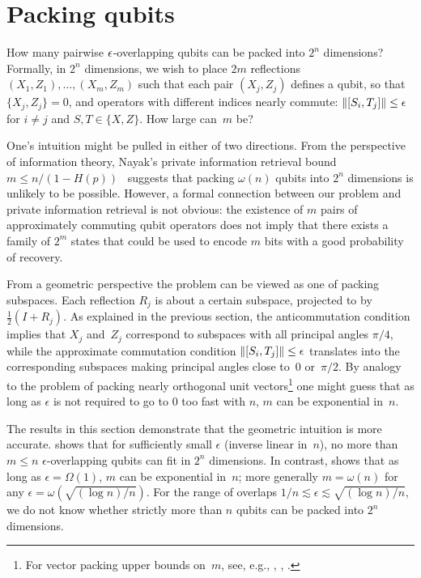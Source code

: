 \documentclass[preprintnumbers,11pt,onecolumn]{article}
\begin{document}
\section{Packing qubits} \label{s:packing}

How many pairwise ${\epsilon}$-overlapping qubits can be packed into $2^n$ dimensions?  Formally, in $2^n$ dimensions, we wish to place $2 m$ reflections $(X_1, Z_1), \ldots, (X_m, Z_m)$ such that each pair $(X_j,Z_j)$ defines a qubit, so that $\{ X_j, Z_j \} = 0$, and operators with different indices nearly commute: ${\| [S_i, T_j] \|} \leq \epsilon$ for $i \neq j$ and $S, T\in \{X,Z\}$. How large can~$m$ be?  

One's intuition might be pulled in either of two directions.  From the perspective of information theory, Nayak's private information retrieval bound $m \leq n / (1 - H(p))$~\cite{Nayak99privateinformationretrieval} suggests that packing $\omega(n)$ qubits into $2^n$ dimensions is unlikely to be possible.  However, a formal connection between our problem and private information retrieval is not obvious: the existence of $m$ pairs of approximately commuting qubit operators does not imply that there exists a family of $2^m$ states that could be used to encode $m$ bits with a good probability of recovery. 

From a geometric perspective the problem can be viewed as one of packing subspaces.  Each reflection $R_j$ is about a certain subspace, projected to by $\tfrac12(I + R_j)$. As explained in the previous section, the anticommutation condition implies that $X_j$ and~$Z_j$ correspond to subspaces with all principal angles $\pi/4$, while the approximate commutation condition ${\| [S_i, T_j] \|} \leq \epsilon$ translates into the corresponding subspaces making principal angles close to~$0$ or~$\pi/2$. By analogy to the problem of packing nearly orthogonal unit vectors\footnote{For vector packing upper bounds on~$m$, see, e.g., \cite{KabatjanskiiLevenstein78vectorpacking}, \cite[Lemma~9.1]{Alon03extremal1}, \cite{Tao13vectorpacking}.} one might guess that as long as $\epsilon$ is not required to go to $0$ too fast with $n$, $m$ can be exponential in~$n$.  

The results in this section demonstrate that the geometric intuition is more accurate.   shows that for sufficiently small $\epsilon$ (inverse linear in~$n$), no more than $m \leq n$ $\epsilon$-overlapping qubits can fit in $2^n$ dimensions.  In contrast,  shows that as long as $\epsilon = \Omega(1)$, $m$ can be exponential in~$n$; more generally $m = \omega(n)$ for any $\epsilon = \omega(\sqrt{(\log n) / n})$.  For the range of overlaps $1 / n \lesssim \epsilon \lesssim \sqrt{(\log n) / n}$, we do not know whether strictly more than $n$ qubits can be packed into $2^n$ dimensions.  
\end{document}
